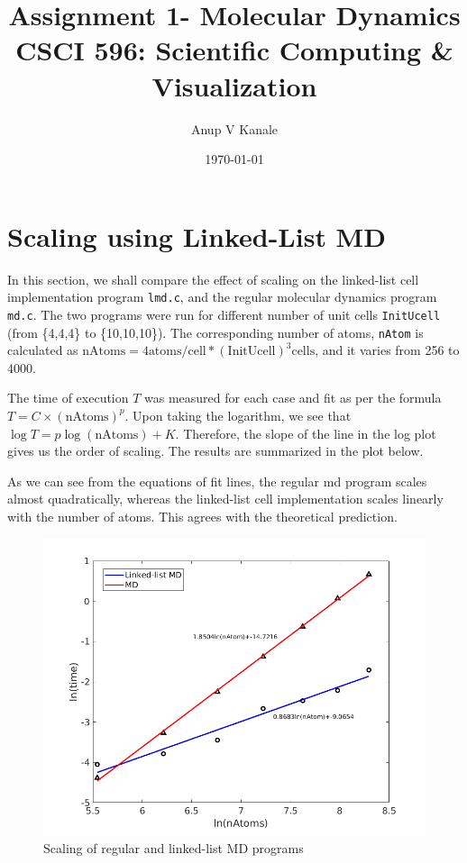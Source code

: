 \documentclass[11pt, oneside]{article}   	%
\title{\vspace{-6ex} Assignment 1- Molecular Dynamics \\ {CSCI 596: Scientific Computing \& Visualization}  \vspace{-2ex}}
\author{Anup V Kanale}
\date{\vspace{-3ex}\today}							%
\begin{document}
\maketitle

\section{Scaling using Linked-List MD}
In this section, we shall compare the effect of scaling on the linked-list cell implementation program \texttt{lmd.c}, and the regular molecular dynamics program \texttt{md.c}. The two programs were run for different number of unit cells \texttt{InitUcell} (from \{4,4,4\} to \{10,10,10\}). The corresponding number of atoms,  \texttt{nAtom} is calculated as $ \text{nAtoms} = 4 \text{atoms/cell} * (\text{InitUcell})^3 \text{cells}$, and it varies from 256 to 4000.

The time of execution $T$ was measured for each case and fit as per the formula $T = C \times (\text{nAtoms})^p$. Upon taking the logarithm, we see that $\log T = p \log (\text{nAtoms}) + K$. Therefore, the slope of the line in the log plot gives us the order of scaling.  The results are summarized in the plot below.

As we can see from the equations of fit lines, the regular md program scales almost quadratically, whereas the linked-list cell implementation scales linearly with the number of atoms. This agrees with the theoretical prediction.
\begin{figure} [!htbp]
	\centering
	\includegraphics[scale=0.5]{mdVsLmd.png}
	\caption{Scaling of regular and linked-list MD programs}
\end{figure}
\end{document}
